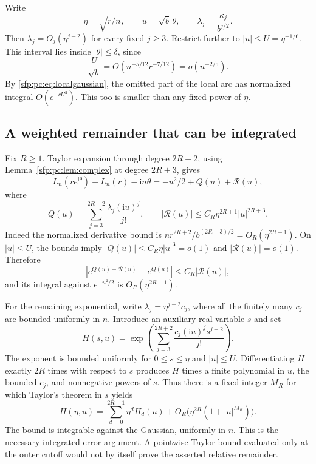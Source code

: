 \documentclass[11pt,letterpaper]{article}
\numberwithin{equation}{section}
\theoremstyle{definition}\newtheorem{definition}[theorem]{Definition}
\theoremstyle{remark}\newtheorem{remark}[theorem]{Remark}
\newcommand{\ii}{\mathrm i}
\begin{document}
Write
\begin{equation}\label{sfp:pc:eq:normalization}
 \eta=\sqrt{r/n},\qquad u=\sqrt b\,\theta,\qquad
 \lambda_j=\frac{\kappa_j}{b^{j/2}}.
\end{equation}
Then $\lambda_j=O_j(\eta^{j-2})$ for every fixed $j\geq3$.
Restrict further to $|u|\leq U=\eta^{-1/6}$. This interval lies
inside $|\theta|\leq\delta$, since
\[
 \frac U{\sqrt b}=O(n^{-5/12}r^{-7/12})=o(n^{-2/5}).
\]
By \eqref{sfp:pc:eq:localgaussian}, the omitted part of the local arc
has normalized integral $O(e^{-cU^2})$. This too is smaller than
any fixed power of $\eta$.

\subsection{A weighted remainder that can be integrated}

Fix $R\geq1$. Taylor expansion through degree $2R+2$, using
Lemma~\ref{sfp:pc:lem:complex} at degree $2R+3$, gives
\begin{equation}\label{sfp:pc:eq:centralphase}
 L_n(re^{\ii\theta})-L_n(r)-\ii n\theta
       =-u^2/2+Q(u)+\mathcal R(u),
\end{equation}
where
\begin{equation}\label{sfp:pc:eq:Q}
 Q(u)=\sum_{j=3}^{2R+2}\frac{\lambda_j(\ii u)^j}{j!},
 \qquad
 |\mathcal R(u)|\leq C_R\eta^{2R+1}|u|^{2R+3}.
\end{equation}
Indeed the normalized derivative bound is
$nr^{2R+2}/b^{(2R+3)/2}=O_R(\eta^{2R+1})$.
On $|u|\leq U$, the bounds imply
$|Q(u)|\leq C_R\eta|u|^3=o(1)$ and
$|\mathcal R(u)|=o(1)$. Therefore
\[
 |e^{Q(u)+\mathcal R(u)}-e^{Q(u)}|
       \leq C_R|\mathcal R(u)|,
\]
and its integral against $e^{-u^2/2}$ is
$O_R(\eta^{2R+1})$.

For the remaining exponential, write
$\lambda_j=\eta^{j-2}c_j$, where all the finitely many $c_j$
are bounded uniformly in $n$. Introduce an auxiliary real variable
$s$ and set
\begin{equation}\label{sfp:pc:eq:H}
 H(s,u)=\exp\left(
    \sum_{j=3}^{2R+2}\frac{c_j(\ii u)^j s^{j-2}}{j!}
                       \right).
\end{equation}
The exponent is bounded uniformly for $0\leq s\leq\eta$ and
$|u|\leq U$. Differentiating $H$ exactly $2R$ times with respect
to $s$ produces $H$ times a finite polynomial in $u$, the bounded
$c_j$, and nonnegative powers of $s$. Thus there is a fixed
integer $M_R$ for which Taylor's theorem in $s$ yields
\begin{equation}\label{sfp:pc:eq:weightedTaylor}
 H(\eta,u)=\sum_{d=0}^{2R-1}\eta^dH_d(u)
          +O_R\bigl(\eta^{2R}(1+|u|^{M_R})\bigr).
\end{equation}
The bound is integrable against the Gaussian, uniformly in $n$.
This is the necessary integrated error argument. A pointwise Taylor
bound evaluated only at the outer cutoff would not by itself prove
the asserted relative remainder.
\end{document}
